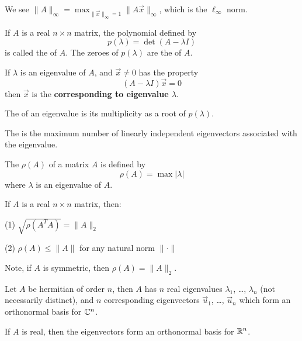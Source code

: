 \begin{ex}
We see
$\|A\|_{\infty}=\max_{\|\vec{x}\|_{\infty}=1}\|A\vec{x}\|_{\infty}$,
which is the $\ell_{\infty}$ norm.
\end{ex}

\begin{defn}
If $A$ is a real $n\times n$ matrix, the polynomial defined by
\begin{equation}
p(\lambda)=\det(A-\lambda I)
\end{equation}
is called the  of $A$. The zeroes of
$p(\lambda)$ are the  of $A$.

If $\lambda$ is an eigenvalue of $A$, and $\vec{x}\neq0$ has the
property
\begin{equation}
(A-\lambda I)\vec{x}=0
\end{equation}
then $\vec{x}$ is the  \textbf{corresponding to
  eigenvalue $\lambda$}.

The  of an eigenvalue is its multiplicity
as a root of $p(\lambda)$.

The  is the maximum number of linearly
independent eigenvectors associated with the eigenvalue.
\end{defn}
\begin{defn}
The  $\rho(A)$ of a matrix $A$ is defined by
\begin{equation}
\rho(A)=\max|\lambda|
\end{equation}
where $\lambda$ is an eigenvalue of $A$.
\end{defn}
\begin{thm}
If $A$ is a real $n\times n$ matrix, then:

(1) $\sqrt{\rho(A^{T}A)}=\|A\|_{2}$

(2) $\rho(A)\leq \|A\|$ for any natural norm $\|\cdot\|$
\end{thm}

Note, if $A$ is symmetric, then $\rho(A)=\|A\|_{2}$.

\begin{thm}
Let $A$ be hermitian of order $n$, then $A$ has $n$ real eigenvalues
$\lambda_1$, \dots, $\lambda_n$ (not necessarily distinct), and $n$
corresponding eigenvectors $\vec{u}_1$, \dots, $\vec{u}_n$ which form an
orthonormal basis for $\mathbb{C}^n$.

If $A$ is real, then the eigenvectors form an orthonormal basis for $\mathbb{R}^n$.
\end{thm}
